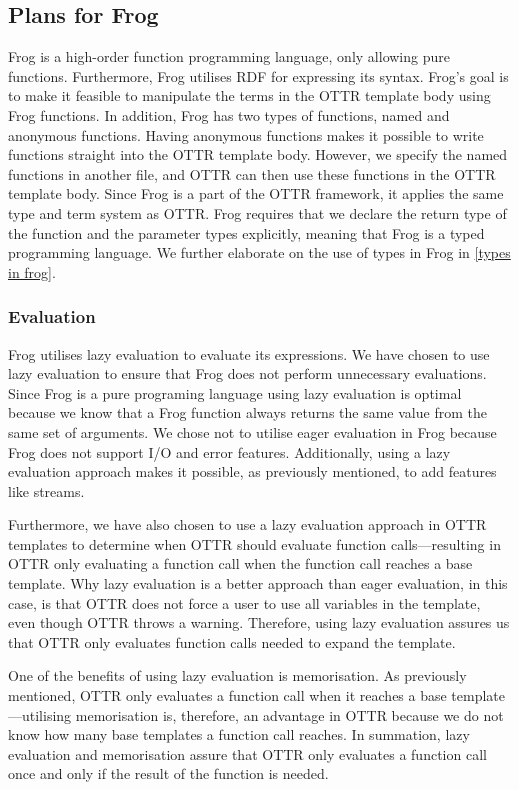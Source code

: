 \subsection{Plans for Frog}
Frog is a high-order function programming language, only allowing pure functions. Furthermore, Frog utilises RDF for expressing its syntax. Frog's goal is to make it feasible to manipulate the terms in the OTTR template body using Frog functions. In addition, Frog has two types of functions, named and anonymous functions. Having anonymous functions makes it possible to write functions straight into the OTTR template body. However, we specify the named functions in another file, and OTTR can then use these functions in the OTTR template body. Since Frog is a part of the OTTR framework, it applies the same type and term system as OTTR. Frog requires that we declare the return type of the function and the parameter types explicitly, meaning that Frog is a typed programming language. We further elaborate on the use of types in Frog in \autoref{types in frog}.


\subsubsection{Evaluation}
\label{frog_evaluation}
Frog utilises lazy evaluation to evaluate its expressions. We have chosen to use lazy evaluation to ensure that Frog does not perform unnecessary evaluations. Since Frog is a pure programing language using lazy evaluation is optimal because we know that a Frog function always returns the same value from the same set of arguments. We chose not to utilise eager evaluation in Frog because Frog does not support I/O and error features. Additionally, using a lazy evaluation approach makes it possible, as previously mentioned, to add features like streams.

\para
Furthermore, we have also chosen to use a lazy evaluation approach in OTTR templates to determine when OTTR should evaluate function calls—resulting in OTTR only evaluating a function call when the function call reaches a base template. Why lazy evaluation is a better approach than eager evaluation, in this case, is that OTTR does not force a user to use all variables in the template, even though OTTR throws a warning. Therefore, using lazy evaluation assures us that OTTR only evaluates function calls needed to expand the template.  

\para
One of the benefits of using lazy evaluation is memorisation. As previously mentioned, OTTR only evaluates a function call when it reaches a base template—utilising memorisation is, therefore, an advantage in OTTR because we do not know how many base templates a function call reaches. In summation, lazy evaluation and memorisation assure that OTTR only evaluates a function call once and only if the result of the function is needed.

